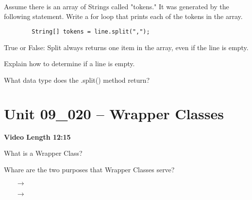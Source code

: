 \documentclass[letterpaper,12pt]{exam}
\newcommand{\unit}{Unit 09}
\begin{document}
\begin{questions}
\begin{samepage}
    \question Assume there is an array of Strings called "tokens."  It was generated by the following statement.  Write a for loop that prints each of the tokens in the array.
    \begin{verbatim}
        String[] tokens = line.split(",");
    \end{verbatim}
        
    \vspace{15mm}
\end{samepage}

\begin{samepage}
    \question True or False:  Split always returns one item in the array, even if the line is empty.
    
\end{samepage}

\begin{samepage}
    \question Explain how to determine if a line is empty.
     \end{samepage}

\begin{samepage}
    \question What data type does the .split() method return?
    \vspace{5mm}
\end{samepage}

\section*{\unit\_020 -- Wrapper Classes } 
\par{\selectfont\textbf{Video Length 12:15}}
\begin{samepage}
    \question What is a Wrapper Class?
    \vspace{10mm}
\end{samepage}

\begin{samepage}
    \question Whare are the two purposes that Wrapper Classes serve?
      \begin{itemize}
        \item[$\rightarrow$]
        \vspace{5mm}
        \item[$\rightarrow$]
        \vspace{5mm}
       \end{itemize}
\end{samepage}


\end{questions}
\end{document}
